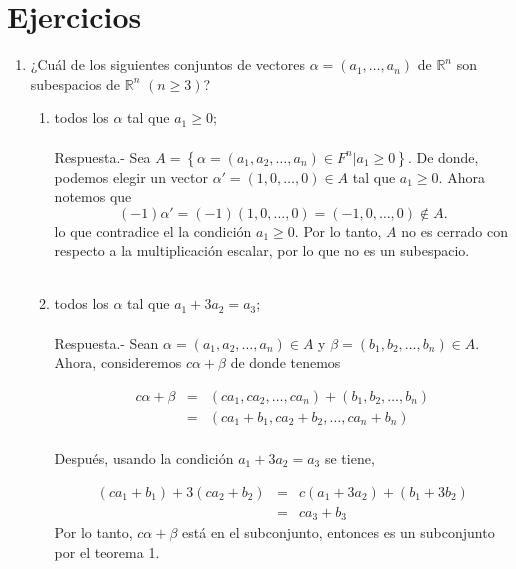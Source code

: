 \section*{Ejercicios}

\begin{enumerate}[\bfseries 1.]

    \item ¿Cuál de los siguientes conjuntos de vectores $\alpha=(a_1,\ldots , a_n)$ de $\mathbb{R}^n$ son subespacios de $\mathbb{R}^n$ $(n\geq 3)$?

	\begin{enumerate}[\bfseries (a)]

	    \item todos los $\alpha$ tal que $a_1\geq 0$;\\\\
		Respuesta.-\; Sea $A=\left\{\alpha = (a_1,a_2,\ldots,a_n)\in F^n | a_1\geq 0\right\}$. De donde, podemos elegir un vector $\alpha'=(1,0,\ldots,0)\in A$ tal que $a_1\geq 0$. Ahora notemos que
		$$(-1)\alpha'=(-1)(1,0,\ldots,0)=(-1,0,\ldots,0)\notin A.$$
		lo que contradice el la condición $a_1\geq 0$. Por lo tanto, $A$ no es cerrado con respecto a la multiplicación escalar, por lo que no es un subespacio.\\\\

	    \item todos los $\alpha$ tal que $a_1+3a_2=a_3$;\\\\
		Respuesta.-\; Sean $\alpha=(a_1,a_2,\ldots,a_n)\in A$ y $\beta=(b_1,b_2,\ldots,b_n)\in A$. Ahora, consideremos $c\alpha+\beta$ de donde tenemos 

		$$
		\begin{array}{rcl}
		    c\alpha+\beta & = & (ca_1,c a_2,\ldots,c a_n)+ (b_1,b_2,\ldots,b_n)\\
		    & = & (ca_1+b_1,c a_2+b_2,\ldots,c a_n+b_n)\\
		\end{array}
		$$

		Después, usando la condición $a_1+3a_2=a_3$ se tiene, 

		$$
		\begin{array}{rcl}
		    (ca_1+b_1)+3(ca_2+b_2) &=& c(a_1+3a_2)+(b_1+3b_2)\\
					   &=& ca_3+b_3 
		\end{array}
		$$
		Por lo tanto, $c\alpha+\beta$ está en el subconjunto, entonces es un subconjunto por el teorema 1.\\\\


\end{enumerate}
\end{enumerate}
